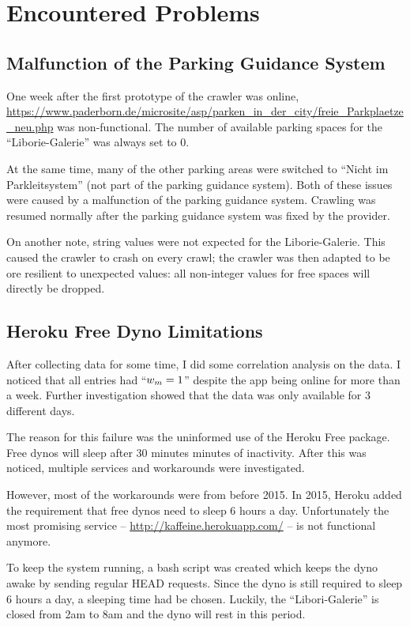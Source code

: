 \section{Encountered Problems}
\subsection{Malfunction of the Parking Guidance System}
One week after the first prototype of the crawler was online, \url{https://www.paderborn.de/microsite/asp/parken_in_der_city/freie_Parkplaetze_neu.php} was non-functional. The number of available parking spaces for the ``Liborie-Galerie'' was always set to \(0\).

At the same time, many of the other parking areas were switched to ``Nicht im Parkleitsystem'' (not part of the parking guidance system). Both of these issues were caused by a malfunction of the parking guidance system. Crawling was resumed normally after the parking guidance system was fixed by the provider.

On another note, string values were not expected for the Liborie-Galerie. This caused the crawler to crash on every crawl; the crawler was then adapted to be ore resilient to unexpected values: all non-integer values for free spaces will directly be dropped.

\subsection{Heroku Free Dyno Limitations}

After collecting data for some time, I did some correlation analysis on the data. I noticed that all entries had ``\(w_m = 1\)'' despite the app being online for more than a week. Further investigation showed that the data was only available for 3 different days. 

The reason for this failure was the uninformed use of the Heroku Free package. Free dynos will sleep after 30 minutes minutes of inactivity. After this was noticed, multiple services and workarounds were investigated.

However, most of the workarounds were from before 2015. In 2015, Heroku added the requirement that free dynos need to sleep 6 hours a day. Unfortunately the most promising service -- \url{http://kaffeine.herokuapp.com/} -- is not functional anymore.

To keep the system running, a bash script was created which keeps the dyno awake by sending regular HEAD requests. Since the dyno is still required to sleep 6 hours a day, a sleeping time had be chosen. Luckily, the ``Libori-Galerie'' is closed from 2am to 8am and the dyno will rest in this period. 

